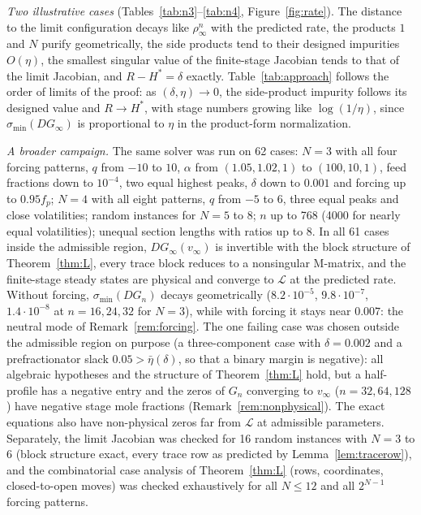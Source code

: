 \documentclass[11pt,a4paper]{report}
\newcommand{\cL}{\mathcal L}
\newcommand{\Hs}{H^{*}}
\begin{document}
\emph{Two illustrative cases} (Tables~\ref{tab:n3}--\ref{tab:n4}, Figure~\ref{fig:rate}). The distance to the limit
configuration decays like \(\rho_\infty^n\) with the predicted rate, the products \(1\) and \(N\) purify geometrically, the side
products tend to their designed impurities \(O(\eta)\), the smallest singular value of the finite-stage Jacobian tends to
that of the limit Jacobian, and \(R-\Hs=\delta\) exactly. Table~\ref{tab:approach} follows the order of limits of the proof:
as \((\delta,\eta)\to0\), the side-product impurity follows its designed value and \(R\to\Hs\), with stage numbers growing like
\(\log(1/\eta)\), since \(\sigma_{\min}(DG_\infty)\) is proportional to \(\eta\) in the product-form normalization.

\emph{A broader campaign.} The same solver was run on 62 cases: \(N=3\) with all four forcing patterns, \(q\) from \(-10\) to
\(10\), \(\alpha\) from \((1.05,1.02,1)\) to \((100,10,1)\), feed fractions down to \(10^{-4}\), two equal highest peaks, \(\delta\) down to
\(0.001\) and forcing up to \(0.95f_p\); \(N=4\) with all eight patterns, \(q\) from \(-5\) to \(6\), three equal peaks and close volatilities;
random instances for \(N=5\) to \(8\); \(n\) up to 768 (4000 for nearly equal volatilities); unequal section lengths with ratios up
to 8. In all 61 cases inside the admissible region, \(DG_\infty(v_\infty)\) is invertible with the block structure of
Theorem~\ref{thm:L}, every trace block reduces to a nonsingular M-matrix, and the finite-stage steady states are physical
and converge to \(\cL\) at the predicted rate. Without forcing, \(\sigma_{\min}(DG_n)\) decays geometrically
(\(8.2\cdot10^{-5}\), \(9.8\cdot10^{-7}\), \(1.4\cdot10^{-8}\) at \(n=16,24,32\) for \(N=3\)), while with forcing it stays near
\(0.007\): the neutral mode of Remark~\ref{rem:forcing}. The one failing case was chosen outside the admissible region on
purpose (a three-component case with \(\delta=0.002\) and a prefractionator slack \(0.05>\bar\eta(\delta)\), so that a binary margin is
negative): all algebraic hypotheses and the structure of Theorem~\ref{thm:L} hold, but a half-profile has a negative entry
and the zeros of \(G_n\) converging to \(v_\infty\) (\(n=32,64,128\)) have negative stage mole fractions
(Remark~\ref{rem:nonphysical}). The exact equations also have non-physical zeros far from \(\cL\) at admissible parameters.
Separately, the limit Jacobian was checked for 16 random instances with \(N=3\) to \(6\) (block structure exact, every trace row
as predicted by Lemma~\ref{lem:tracerow}), and the combinatorial case analysis of Theorem~\ref{thm:L} (rows, coordinates,
closed-to-open moves) was checked exhaustively for all \(N\le12\) and all \(2^{N-1}\) forcing patterns.
\end{document}
